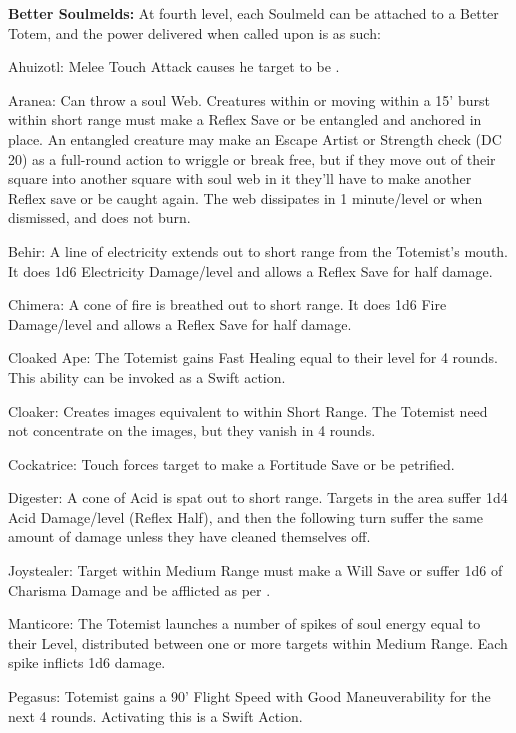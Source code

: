\textbf{Better Soulmelds:} At fourth level, each Soulmeld can be attached to a Better Totem, and the power delivered when called upon is as such:
\begin{description*}
\item[Ahuizotl:] Melee Touch Attack causes he target to be .
\item[Aranea:] Can throw a soul Web. Creatures within or moving within a 15' burst within short range must make a Reflex Save or be entangled and anchored in place. An entangled creature may make an Escape Artist or Strength check (DC 20) as a full-round action to wriggle or break free, but if they move out of their square into another square with soul web in it they'll have to make another Reflex save or be caught again. The web dissipates in 1 minute/level or when dismissed, and does not burn.
\item[Behir:] A line of electricity extends out to short range from the Totemist's mouth. It does 1d6 Electricity Damage/level and allows a Reflex Save for half damage.
\item[Chimera:] A cone of fire is breathed out to short range. It does 1d6 Fire Damage/level and allows a Reflex Save for half damage.
\item[Cloaked Ape:] The Totemist gains Fast Healing equal to their level for 4 rounds. This ability can be invoked as a Swift action.
\item[Cloaker:] Creates images equivalent to  within Short Range. The Totemist need not concentrate on the images, but they vanish in 4 rounds.
\item[Cockatrice:] Touch forces target to make a Fortitude Save or be petrified.
\item[Digester:] A cone of Acid is spat out to short range. Targets in the area suffer 1d4 Acid Damage/level (Reflex Half), and then the following turn suffer the same amount of damage unless they have cleaned themselves off.
\item[Joystealer:] Target within Medium Range must make a Will Save or suffer 1d6 of Charisma Damage and be afflicted as per .
\item[Manticore:] The Totemist launches a number of spikes of soul energy equal to their Level, distributed between one or more targets within Medium Range. Each spike inflicts 1d6 damage.
\item[Pegasus:] Totemist gains a 90' Flight Speed with Good Maneuverability for the next 4 rounds. Activating this is a Swift Action.

\end{description*}
